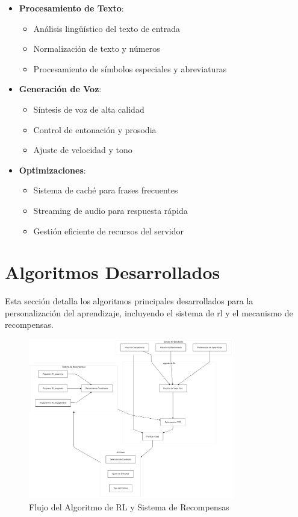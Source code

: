 \begin{itemize}
    \item \textbf{Procesamiento de Texto}:
    \begin{itemize}
        \item Análisis lingüístico del texto de entrada
        \item Normalización de texto y números
        \item Procesamiento de símbolos especiales y abreviaturas
    \end{itemize}

    \item \textbf{Generación de Voz}:
    \begin{itemize}
        \item Síntesis de voz de alta calidad
        \item Control de entonación y prosodia
        \item Ajuste de velocidad y tono
    \end{itemize}

    \item \textbf{Optimizaciones}:
    \begin{itemize}
        \item Sistema de caché para frases frecuentes
        \item Streaming de audio para respuesta rápida
        \item Gestión eficiente de recursos del servidor
    \end{itemize}
\end{itemize}

\section{Algoritmos Desarrollados}
\label{algoritmos-desarrollados}

Esta sección detalla los algoritmos principales desarrollados para la personalización del aprendizaje, incluyendo el sistema de \gls{rl} y el mecanismo de recompensas.

\begin{figure}[H]
	\caption{Flujo del Algoritmo de RL y Sistema de Recompensas}
	\label{fig:rl-flow}
	\includegraphics[width=0.8\textwidth]{figuras/rl-flow.png}
\end{figure}

